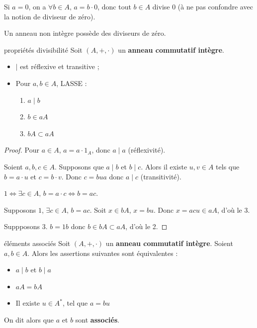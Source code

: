 \begin{remarque}
    Si $a = 0$, on a $\forall b \in A, \, a = b \cdot 0$, donc tout 
    $b \in A$ divise $0$ (à ne pas confondre avec la notion de diviseur de zéro).
\end{remarque}

\begin{remarque}
    Un anneau non intègre possède des diviseurs de zéro.
\end{remarque}

\begin{proposition}{propriétés divisibilité}{}
    Soit $(A, +, \cdot)$ un \textbf{anneau commutatif intègre}. 

    \begin{itemize}
        \item $\mid$ est réflexive et transitive ;
        \item Pour $a, b \in A$, LASSE : 
        \begin{enumerate}
            \item $a \mid b$ 
            \item $b \in aA$
            \item $bA \subset aA$
        \end{enumerate}
    \end{itemize}
\end{proposition}

\begin{proof}
    Pour $a \in A$, $a = a \cdot 1_A$, donc $a \mid a$ (réflexivité).

    Soient $a, b, c \in A$. Supposons que $a \mid b$ et $b \mid c$.
    Alors il existe $u, v \in A$ tels que $b = a \cdot u$ et $c = b \cdot v$.
    Donc $c = bua$ donc $a \mid c$ (transitivité).

    \avspace $1 \Leftrightarrow \exists c \in A, \, b = a \cdot c \Leftrightarrow b = ac$.

    Supposons $1$, $\exists c \in A, \, b = ac$. Soit $x \in bA$, $x = bu$. Donc $x = acu \in aA$,
    d'où le 3.

    Suppposons 3. $b = 1b$ donc $b \in bA \subset aA$, d'où le 2.
\end{proof}

\begin{theoreme}{éléments associés}{}
    Soit $(A, +, \cdot)$ un \textbf{anneau commutatif intègre}. 
    Soient $a, b \in A$. Alors les assertions suivantes sont équivalentes : 
    \avspace 
    
    \begin{itemize}
        \item $a \mid b$ et $b \mid a$
        \item $aA = bA$
        \item Il existe $u \in A^*$, tel que $a = bu$
    \end{itemize}

    On dit alors que $a$ et $b$ sont \textbf{associés}.
\end{theoreme}

